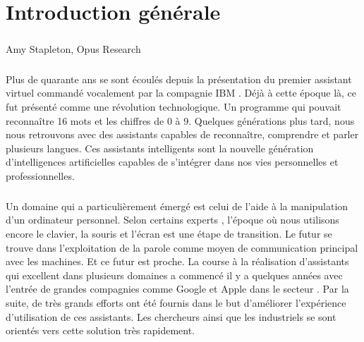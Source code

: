 \chapter*{Introduction générale}
\paragraph{}
\begin{chapquote}{Amy Stapleton, Opus Research}
\end{chapquote}

\paragraph{}
Plus de quarante ans se sont écoulés depuis la présentation du premier assistant virtuel commandé vocalement par la compagnie IBM \citep{ibm_spa}. Déjà à cette époque là, ce fut présenté comme une révolution technologique. Un programme qui pouvait reconnaître 16 mots et les chiffres de 0 à 9. Quelques générations plus tard, nous nous retrouvons avec des assistants capables de reconnaître, comprendre et parler plusieurs langues. Ces assistants intelligents sont la nouvelle génération d'intelligences artificielles capables de s'intégrer dans nos vies personnelles et professionnelles. 

\paragraph{}
Un domaine qui a particulièrement émergé est celui de l'aide à la manipulation d'un ordinateur personnel. Selon certains experts \citep{spa_arch,virtualbutler,SPA-overview}, l'époque où nous utilisons encore le clavier, la souris et l'écran est une étape de transition. Le futur se trouve dans l'exploitation de la parole comme moyen de communication principal avec les machines. Et ce futur est proche. La course à la réalisation d'assistants qui excellent dans plusieurs domaines a commencé il y a quelques années avec l'entrée de grandes compagnies comme Google et Apple dans le secteur \citep{spas_survey}. Par la suite, de très grands efforts ont été fournis dans le but d'améliorer l'expérience d'utilisation de ces assistants. Les chercheurs ainsi que les industriels se sont orientés vers cette solution très rapidement.

